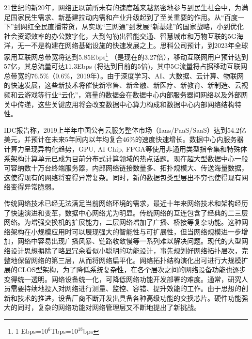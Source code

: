
\label{chap1}


\label{chap11}
\label{chap111}


21世纪的新20年，网络正以前所未有的速度越来越紧密地参与到民生社会中，为满足国家民生需求、新基建拉动内需和产业升级起到了至关重要的作用。从“百度一下”到网红全民直播带货，从实现“三网通”到发展“新基建”的国家战略，小到优化社会资源效率的办公数字化，大到勾勒出智能交通、智慧城市和万物互联的5G海洋，无一不是构建在网络基础设施的快速发展之上。思科公司预计，到2023年全球家用互联网总带宽将达到$5.85$Ebps\footnote{1 Ebps=$10^6$Tbps=$10^{18}$bps} （是现在的3.27倍），移动互联网用户预计达到57亿，其总流量可达$11.3$Ebps (将达到目前的5倍)，其中5G流量将占据移动互联网总带宽的76.5\%（0.6\%，2019年）。由于深度学习、AI、大数据、云计算、物联网的快速发展，这些新技术将催使新零售、新金融、新医疗、新教育、新制造、云视频和云游戏等行业“云化”，海量的数据会在数据中心内部服务器间网络以及外部网关中传递，这些关键应用将会改变数据中心算力构成和数据中心内部网络结构特性。

IDC报告称，2019上半年中国公有云服务整体市场（Iaas/PaaS/SaaS）达到54.2亿美元，并预计在未来5年间内以年均复合46\%的速度快速增长。数据中心内服务器计算力呈现异构化趋势，GPU, AI Chip, FPGA等使用非通用类型指令集和特殊体系架构计算单元已成为目前分布式计算领域的热点话题。现在超大型数据中心一般可容纳数十万台终端服务器，内部网络链接数量多、拓扑规模大、传送海量数据，这使得现有的网络将变得异常复杂。同时，新的数据包类型层出不穷也使得现有网络变得异常脆弱。

传统网络技术已经无法满足当前网络环境的需求，最近十年来网络技术和架构经历了快速演进和变革，数据中心网络尤为明显。传统网络的互连包含了经典的二三层网络。为增强交换机的扩展能力，二层网络增加了广播、桥接等复杂功能。这种网络架构在小规模应用时可以展现强大的智能性与可扩展性，但当网络规模进一步增加，网络中容易出现广播风暴、链路收敛慢等一系列难以解决问题。现代的大型网络设计思想摒除了略显冗余看似小聪明的功能设计，事先规划好网络拓扑层次，完整地保留网络的第三层，从而将网络扁平化。网络拓扑结构演化出可进行大规模扩展的CLOS型架构，为了降低系统复杂性，在各个层次之间的网络设备功能也逐步变得统一透明。网络设备统一化，可降低网络功能开发部署的难度。通常，研究人员需要持续地投入对网络进行测量、监控、容错、提升效能的工作。由于思想的创新和技术的推进，设备厂商不断开发出具备各种高级功能的交换芯片。硬件功能强大的同时，复杂的网络功能对网络管理层又不断地提出了新挑战。

